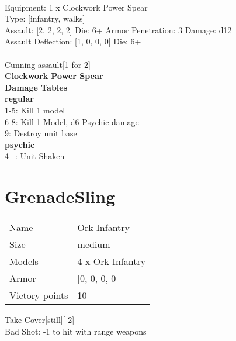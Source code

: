  \\
Equipment: 1 x Clockwork Power Spear \\
Type: [infantry, walks] \\

Assault: [2, 2, 2, 2] Die: 6+ Armor Penetration: 3 Damage: d12 \\
Assault Deflection: [1, 0, 0, 0] Die: 6+\\
\\ 
Cunning assault[1 for 2]\\ 
 



{\bf Clockwork Power Spear } \\






 





{\bf Damage Tables} \\
 {\bf regular } \\
1-5: Kill 1 model \\
6-8: Kill 1 Model, d6 Psychic damage \\
9: Destroy unit base \\
 {\bf psychic } \\
4+: Unit Shaken \\










\pagebreak\pagebreak

\section{ GrenadeSling }

\begin{tabular}{ll}
  Name & Ork Infantry \\
  Size & medium\\
  Models & 4 x Ork Infantry\\
  Armor & [0, 0, 0, 0]\\
  Victory points & 10\\
\end{tabular}

Take Cover[still][-2]\\ 
Bad Shot: -1 to hit with range weapons\\ 


